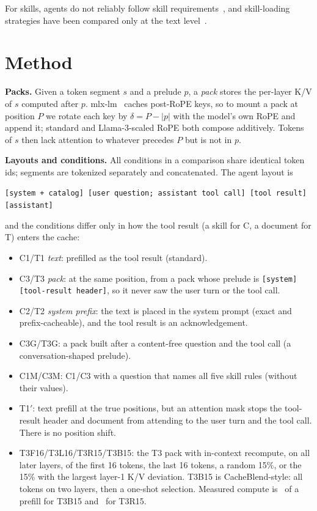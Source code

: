 \documentclass[10pt]{article}
\newcommand{\cond}[1]{\textsf{#1}}
\begin{document}
For skills, agents do not reliably follow skill requirements~\citep{li2026hexis}, and skill-loading strategies have been compared
only at the text level~\citep{zhang2026progressive,nakasuji2026skillblocks}.

\section{Method}\label{sec:method}
\textbf{Packs.} Given a token segment $s$ and a prelude $p$, a \emph{pack} stores the per-layer K/V of $s$ computed after $p$.
mlx-lm~\citep{hannun2023mlx} caches post-RoPE keys, so to mount a pack at position $P$ we rotate each key by $\delta = P - |p|$
with the model's own RoPE and append it; standard and Llama-3-scaled RoPE both compose additively. Tokens of $s$ then lack
attention to whatever precedes $P$ but is not in $p$.

\textbf{Layouts and conditions.} All conditions in a comparison share identical token ids; segments are tokenized separately and
concatenated. The agent layout is
\begin{center}\small\texttt{[system + catalog] [user question; assistant tool call] [tool result] [assistant]}\end{center}
and the conditions differ only in how the tool result (a skill for \cond{C}, a document for \cond{T}) enters the cache:
\begin{itemize}\itemsep0pt
\item \cond{C1}/\cond{T1} \emph{text}: prefilled as the tool result (standard).
\item \cond{C3}/\cond{T3} \emph{pack}: at the same position, from a pack whose prelude is \texttt{[system][tool-result header]}, so it never saw the user turn or the tool call.
\item \cond{C2}/\cond{T2} \emph{system prefix}: the text is placed in the system prompt (exact and prefix-cacheable), and the tool result is an acknowledgement.
\item \cond{C3G}/\cond{T3G}: a pack built after a content-free question and the tool call (a conversation-shaped prelude).
\item \cond{C1M}/\cond{C3M}: \cond{C1}/\cond{C3} with a question that names all five skill rules (without their values).
\item \cond{T1$'$}: text prefill at the true positions, but an attention mask stops the tool-result header and document from attending to the user turn and the tool call. There is no position shift.
\item \cond{T3F16}/\cond{T3L16}/\cond{T3R15}/\cond{T3B15}: the \cond{T3} pack with in-context recompute, on all later layers, of the first 16 tokens, the last 16 tokens, a random 15\%, or the 15\% with the largest layer-1 K/V deviation. \cond{T3B15} is CacheBlend-style: all tokens on two layers, then a one-shot selection. Measured compute is \FracBlend\ of a prefill for \cond{T3B15} and \FracRandom\ for \cond{T3R15}.
\end{itemize}
\end{document}
